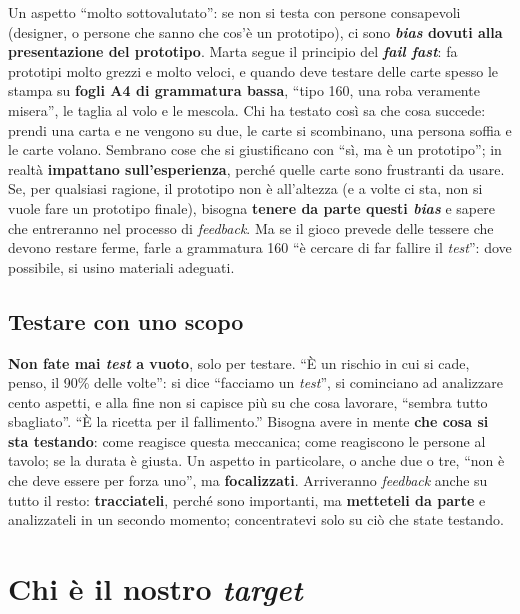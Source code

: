Un aspetto ``molto sottovalutato'': se non si testa con persone consapevoli (designer, o
persone che sanno che cos'è un prototipo), ci sono \textbf{\emph{bias} dovuti alla
presentazione del prototipo}. Marta segue il principio del \textbf{\emph{fail fast}}: fa
prototipi molto grezzi e molto veloci, e quando deve testare delle carte spesso le stampa su
\textbf{fogli A4 di grammatura bassa}, ``tipo 160, una roba veramente misera'', le taglia al
volo e le mescola. Chi ha testato così sa che cosa succede: prendi una carta e ne vengono su
due, le carte si scombinano, una persona soffia e le carte volano. Sembrano cose che si
giustificano con ``sì, ma è un prototipo''; in realtà \textbf{impattano sull'esperienza},
perché quelle carte sono frustranti da usare. Se, per qualsiasi ragione, il prototipo non
è all'altezza (e a volte ci sta, non si vuole fare un prototipo finale), bisogna
\textbf{tenere da parte questi \emph{bias}} e sapere che entreranno nel processo di
\emph{feedback}. Ma se il gioco prevede delle tessere che devono restare ferme, farle a
grammatura 160 ``è cercare di far fallire il \emph{test}'': dove possibile, si usino
materiali adeguati.

\subsection{Testare con uno scopo}

\textbf{Non fate mai \emph{test} a vuoto}, solo per testare. ``È un rischio in cui si cade,
penso, il 90\% delle volte'': si dice ``facciamo un \emph{test}'', si cominciano ad analizzare
cento aspetti, e alla fine non si capisce più su che cosa lavorare, ``sembra tutto
sbagliato''. ``È la ricetta per il fallimento.'' Bisogna avere in mente \textbf{che cosa si
sta testando}: come reagisce questa meccanica; come reagiscono le persone al tavolo; se la
durata è giusta. Un aspetto in particolare, o anche due o tre, ``non è che deve essere per
forza uno'', ma \textbf{focalizzati}. Arriveranno \emph{feedback} anche su tutto il resto:
\textbf{tracciateli}, perché sono importanti, ma \textbf{metteteli da parte} e analizzateli
in un secondo momento; concentratevi solo su ciò che state testando.

\section{Chi è il nostro \emph{target}}
\label{a13:sec:target}


